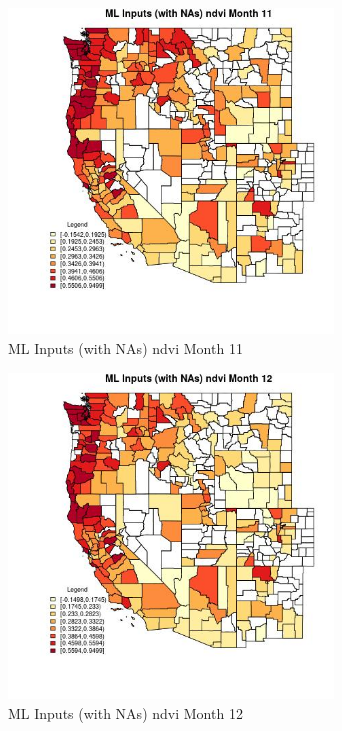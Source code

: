 \begin{figure} 
\centering  
\includegraphics[width=0.77\textwidth]{Code_Outputs/Report_ML_input_PM25_Step4_part_e_de_duplicated_aves_compiled_2019-05-21wNAs_CountyndvimedianMonth11.jpg} 
\caption{\label{fig:Report_ML_input_PM25_Step4_part_e_de_duplicated_aves_compiled_2019-05-21wNAsCountyndvimedianMonth11}ML Inputs (with NAs) ndvi Month 11} 
\end{figure} 
 

\begin{figure} 
\centering  
\includegraphics[width=0.77\textwidth]{Code_Outputs/Report_ML_input_PM25_Step4_part_e_de_duplicated_aves_compiled_2019-05-21wNAs_CountyndvimedianMonth12.jpg} 
\caption{\label{fig:Report_ML_input_PM25_Step4_part_e_de_duplicated_aves_compiled_2019-05-21wNAsCountyndvimedianMonth12}ML Inputs (with NAs) ndvi Month 12} 
\end{figure} 
 
